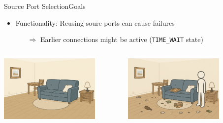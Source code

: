 \documentclass[aspectratio=169, hyperref={colorlinks=true, allcolors=SecondaryColor}, c]{beamer}
\begin{document}
	\begin{frame}[fragile]{Source Port Selection}{Goals}
		\begin{itemize}
			\item \alert{Functionality:} Reusing soure ports can cause failures
			\begin{itemize}
				\item[\alert{$\Rightarrow$}] Earlier connections might be active (\texttt{TIME\_WAIT} state)
			\end{itemize}
		\end{itemize}
		\begin{columns}
			\begin{column}[t]{0.33\textwidth}
				\vspace{2cm}

				\includegraphics[width=0.8\textwidth, center]{./figures/room_cleaned.png}
			\end{column}
			\begin{column}[t]{0.33\textwidth}
				\vspace{0cm}

				\includegraphics[width=0.8\textwidth, center]{./figures/room_not_cleaned.png}
			\end{column}
			\begin{column}[t]{0.33\textwidth}
				\vspace{0cm}


\end{column}
\end{columns}
\end{frame}
\end{document}
